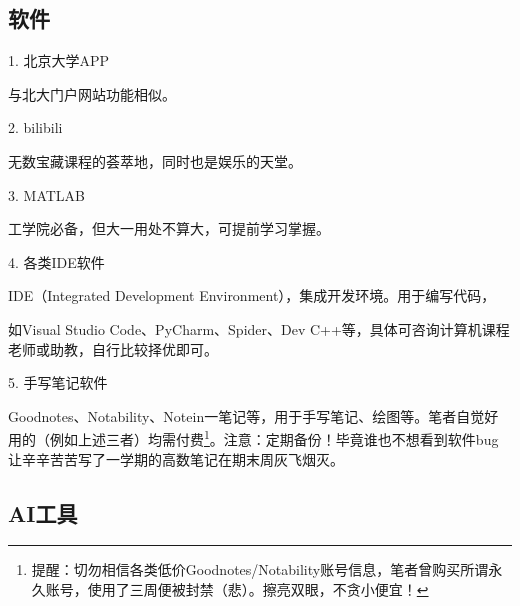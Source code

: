 \documentclass[11pt,oneside]{book}
\begin{document}
\subsection{软件}

1. 北京大学APP

与北大门户网站功能相似。

2. bilibili

无数宝藏课程的荟萃地，同时也是娱乐的天堂。

3. MATLAB

工学院必备，但大一用处不算大，可提前学习掌握。

4. 各类IDE软件

IDE（Integrated Development Environment），集成开发环境。用于编写代码，

如Visual Studio Code、PyCharm、Spider、Dev C++等，具体可咨询计算机课程老师或助教，自行比较择优即可。

5. 手写笔记软件

Goodnotes、Notability、Notein一笔记等，用于手写笔记、绘图等。笔者自觉好用的（例如上述三者）均需付费\footnote{提醒：切勿相信各类低价Goodnotes/Notability账号信息，笔者曾购买所谓永久账号，使用了三周便被封禁（悲）。擦亮双眼，不贪小便宜！}。注意：定期备份！毕竟谁也不想看到软件bug让辛辛苦苦写了一学期的高数笔记在期末周灰飞烟灭。

\subsection{AI工具}
\end{document}
